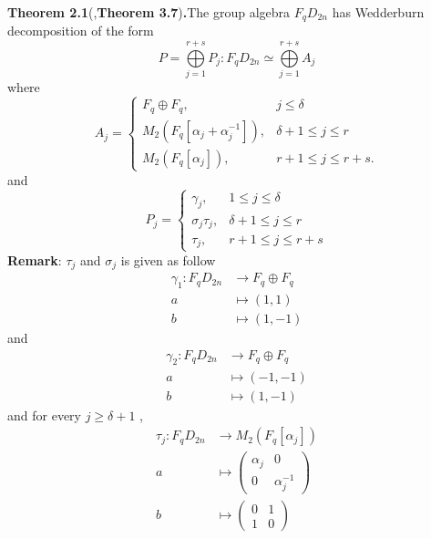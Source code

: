 \documentclass{article}
\begin{document}
\textbf{Theorem 2.1}(\cite{bib7},\textbf{Theorem 3.7})\textbf{.}The group algebra $F_qD_{2n}$ has Wedderburn decomposition of the form 
\begin{equation}
    P=\mathop{\bigoplus}\limits_{j=1}^{r+s}P_j:F_qD_{2n}\simeq\mathop{\bigoplus}\limits_{j=1}^{r+s}A_j
\end{equation}
where
\begin{equation}
    A_j=\begin{cases}
        F_q\oplus F_q, & j\leq\delta  \\
        M_2(F_q[\alpha_j+\alpha_j^{-1}]), & \delta+1\leq j\leq r\\
        M_2(F_q[\alpha_j]), & r+1\leq j\leq r+s.
    \end{cases}
\end{equation}
and\\
\begin{equation}
   P_j=\begin{cases}
   \gamma_j, & 1\leq j\leq \delta\\
   \sigma_j\tau_j, & \delta+1\leq j\leq r\\
   \tau_j, & r+1\leq j\leq r+s
   \end{cases}
\end{equation}
\textbf{Remark}: $\tau_j$ and $\sigma_j$ is given as follow
\begin{align*}   
    \gamma_1:F_qD_{2n}&\rightarrow F_q\oplus F_q\\
    a\quad&\mapsto(1,1)\\
    b\quad&\mapsto(1,-1)
\end{align*}
and
\begin{align*}   
    \gamma_2:F_qD_{2n}&\rightarrow F_q\oplus F_q\\
    a\quad&\mapsto(-1,-1)\\
    b\quad&\mapsto(1,-1)
\end{align*}
and for every $j\geq\delta+1$ ,
\begin{align*}
    \tau_j:F_qD_{2n}&\rightarrow M_2(F_q[\alpha_j])\\
    a\quad&\mapsto\begin{pmatrix}
        \alpha_j&0\\
        0&\alpha_j^{-1}
    \end{pmatrix}\\
    b\quad&\mapsto\begin{pmatrix}
        0&1\\
        1&0
    \end{pmatrix}
\end{align*}
\end{document}
